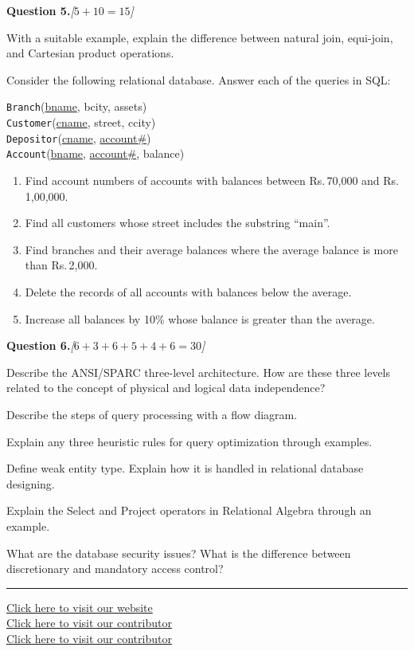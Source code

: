 \documentclass[11pt,a4paper]{article}
\newcommand{\pts}[1]{\hfill   \textit{[#1]}}
\begin{document}
\bigskip




\noindent   \textbf{Question 5.}\pts{$5+10=15$}

\begin{parts}
  \item With a suitable example, explain the difference between natural join, equi-join, and Cartesian product operations.
  \item Consider the following relational database. Answer each of the queries in SQL:

  \smallskip
   \texttt{Branch}(\underline{bname}, bcity, assets)\\
   \texttt{Customer}(\underline{cname}, street, ccity)\\
   \texttt{Depositor}(\underline{cname}, \underline{account\#})\\
   \texttt{Account}(\underline{bname}, \underline{account\#}, balance)

  
\begin{enumerate}[label=(\roman*)]
    \item Find account numbers of accounts with balances between Rs.\,70,000 and Rs.\,1,00,000.
    \item Find all customers whose street includes the substring ``main''.
    \item Find branches and their average balances where the average balance is more than Rs.\,2,000.
    \item Delete the records of all accounts with balances below the average.
    \item Increase all balances by 10\% whose balance is greater than the average.
  \end{enumerate}
\end{parts}

\bigskip




\noindent   \textbf{Question 6.}\pts{$6+3+6+5+4+6=30$}

\begin{parts}
  \item Describe the ANSI/SPARC three-level architecture. How are these three levels related to the concept of physical and logical data independence?
  \item Describe the steps of query processing with a flow diagram.
  \item Explain any three heuristic rules for query optimization through examples.
  \item Define weak entity type. Explain how it is handled in relational database designing.
  \item Explain the Select and Project operators in Relational Algebra through an example.
  \item What are the database security issues? What is the difference between discretionary and mandatory access control?
\end{parts}

\vfill
\rule{\linewidth}{0.4pt}

\begin{center}\small
\href{https://bhu-exam.vercel.app/}{Click here to visit our website}\\[4pt]\href{https://me-aryan.vercel.app/}{Click here to visit our contributor}\\[4pt]\href{https://quashan-me.vercel.app/}{Click here to visit our contributor}
\end{center}
\end{document}
